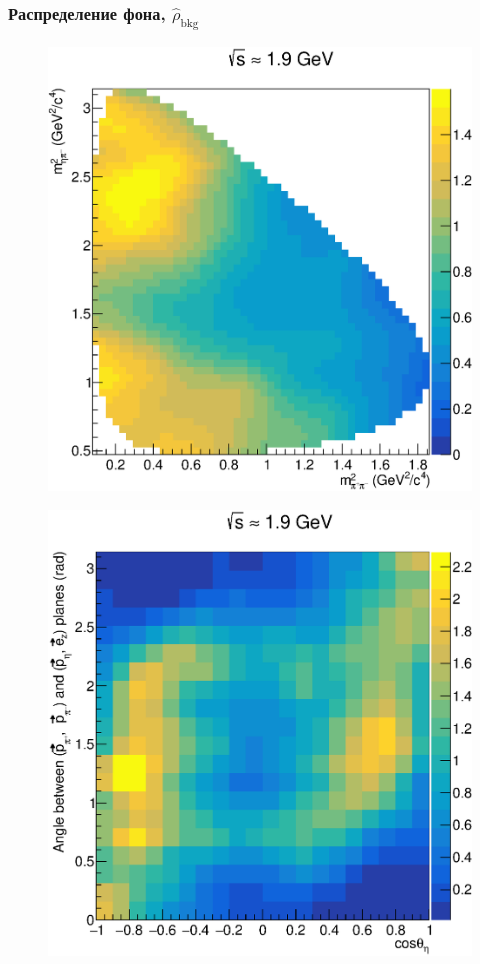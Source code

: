 \documentclass{beamer}
\begin{document}
\begin{frame}
  \frametitle{Распределение фона, $\hat{\rho}_{\text{bkg}}$}
  \begin{center}
    \begin{minipage}[t]{0.4\linewidth}
      \begin{figure}
        \includegraphics[width=\linewidth]{figures/kde_xy_background.eps}
      \end{figure}
    \end{minipage}
    \begin{minipage}[t]{0.4\linewidth}
      \begin{figure}
        \includegraphics[width=\linewidth]{figures/kde_zu_background.eps}

\end{figure}
\end{minipage}
\end{center}
\end{frame}
\end{document}
